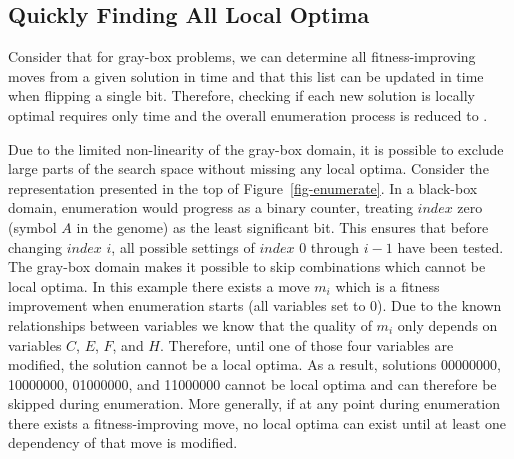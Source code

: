 \subsection{Quickly Finding All Local Optima}

Consider that for gray-box problems, we can determine all fitness-improving moves from a given
solution in  time and that this list can be updated in  time when flipping
a single bit. Therefore, checking if each new solution is locally optimal requires
only  time and the overall enumeration process is reduced to .

\begin{figure*}
  \centering
  \caption{Example change of enumeration ordering. The gray loci represent all dependencies
           for some move $m_i$. By reordering, $m_i$'s lowest $index$ dependency improves from 2 to 4.}
  \label{fig-enumerate}
\end{figure*}

Due to the limited non-linearity of the gray-box domain, it is possible to exclude large
parts of the search space without missing any local optima.
Consider the representation presented in the top of Figure~\ref{fig-enumerate}. In a black-box
domain, enumeration would progress as a binary counter, treating $index$ zero (symbol $A$ in the genome) as
the least significant bit. This ensures that before changing $index$ $i$, all possible settings of $index$
0 through $i-1$ have been tested. The gray-box domain makes it possible to skip combinations
which cannot be local optima. In this example there exists a move $m_i$ which is a fitness improvement
when enumeration starts (all variables set to 0). Due to the known relationships between variables
we know that the quality of $m_i$ only depends on variables $C$, $E$, $F$, and $H$.
Therefore, until one of those four variables are modified, the solution cannot be a local optima.
As a result, solutions 00000000, 10000000, 01000000, and 11000000 cannot be local optima and can
therefore be skipped during enumeration. More generally, if at any point during enumeration
there exists a fitness-improving move, no local optima can exist until at least one
dependency of that move is modified.

